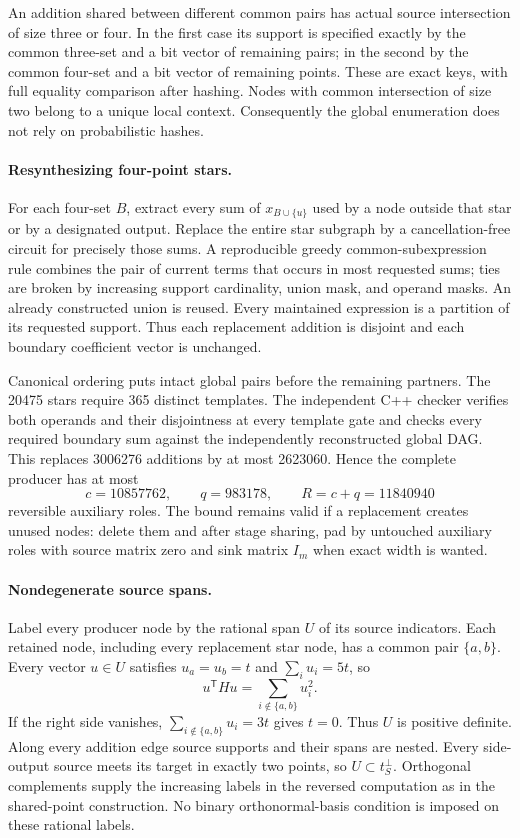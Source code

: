 An addition shared between different common pairs has actual source
intersection of size three or four. In the first case its support is specified
exactly by the common three-set and a bit vector of remaining pairs; in the
second by the common four-set and a bit vector of remaining points.
These are exact keys, with full equality comparison after hashing. Nodes
with common intersection of size two belong to a unique local context.
Consequently the global enumeration does not rely on probabilistic hashes.

\paragraph{Resynthesizing four-point stars.}
For each four-set $B$, extract every sum of $x_{B\cup\{u\}}$ used by a node
outside that star or by a designated output. Replace the entire star
subgraph by a cancellation-free circuit for precisely those sums. A
reproducible greedy common-subexpression rule combines the pair of current
terms that occurs in most requested sums; ties are broken by increasing
support cardinality, union mask, and operand masks. An already constructed
union is reused. Every maintained expression is a partition of its requested
support. Thus each replacement addition is disjoint and each boundary
coefficient vector is unchanged.

Canonical ordering puts intact global pairs before the remaining partners.
The 20475 stars require 365 distinct templates. The independent C++ checker
verifies both operands and their disjointness at every template gate and
checks every required boundary sum against the independently reconstructed
global DAG. This replaces 3006276 additions by at most 2623060. Hence the
complete producer has at most
\[
 c=10857762,\qquad q=983178,\qquad R=c+q=11840940
\]
reversible auxiliary roles. The bound remains valid if a replacement creates
unused nodes: delete them and after stage sharing, pad by untouched auxiliary roles with source
matrix zero and sink matrix $I_m$ when exact width is wanted.

\paragraph{Nondegenerate source spans.}
Label every producer node by the rational span $U$ of its source indicators.
Each retained node, including every replacement star node, has a common
pair $\{a,b\}$. Every vector $u\in U$ satisfies
$u_a=u_b=t$ and $\sum_i u_i=5t$, so
\[
 u^{\mathsf T}Hu=\sum_{i\notin\{a,b\}}u_i^2.
\]
If the right side vanishes, $\sum_{i\notin\{a,b\}}u_i=3t$ gives $t=0$.
Thus $U$ is positive definite. Along every addition edge source supports
and their spans are nested. Every side-output source meets its target in
exactly two points, so $U\subset t_S^\perp$. Orthogonal complements supply
the increasing labels in the reversed computation as in the shared-point
construction. No binary orthonormal-basis condition is imposed on these
rational labels.

